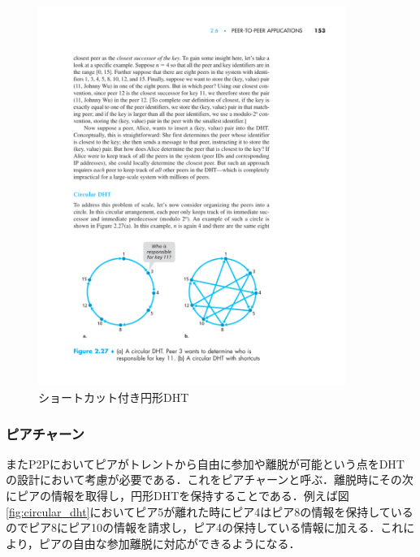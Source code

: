 \documentclass[9pt,a4j,twocolumn]{jsarticle}
\begin{document}
\begin{figure}[tb]
\includegraphics[width=10cm,pagebox=cropbox,clip]{CircularDHTWithShortcuts.pdf}
 \caption{ショートカット付き円形DHT}
 \label{fig:circular_dht_with_shortcuts}
\end{figure}

\subsubsection{ピアチャーン}
またP2Pにおいてピアがトレントから自由に参加や離脱が可能という点をDHTの設計において考慮が必要である．これをピアチャーンと呼ぶ．離脱時にその次にピアの情報を取得し，円形DHTを保持することである．例えば図\ref{fig:circular_dht}においてピア5が離れた時にピア4はピア8の情報を保持しているのでピア8にピア10の情報を請求し，ピア4の保持している情報に加える．これにより，ピアの自由な参加離脱に対応ができるようになる．
\\
\end{document}
